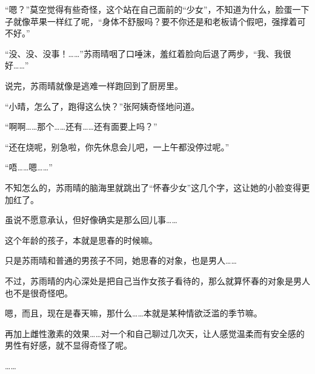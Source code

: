 “嗯？”莫空觉得有些奇怪，这个站在自己面前的“少女”，不知道为什么，脸蛋一下子就像苹果一样红了呢，“身体不舒服吗？要不你还是和老板请个假吧，强撑着可不好。”

“没、没、没事！……”苏雨晴咽了口唾沫，羞红着脸向后退了两步，“我、我很好……”

说完，苏雨晴就像是逃难一样跑回到了厨房里。

“小晴，怎么了，跑得这么快？”张阿姨奇怪地问道。

“啊啊……那个……还有……还有面要上吗？”

“还在烧呢，别急啦，你先休息会儿吧，一上午都没停过呢。”

“唔……嗯……”

不知怎么的，苏雨晴的脑海里就跳出了“怀春少女”这几个字，这让她的小脸变得更加红了。

虽说不愿意承认，但好像确实是那么回儿事……

这个年龄的孩子，本就是思春的时候嘛。

只是苏雨晴和普通的男孩子不同，她思春的对象，也是男人……

不过，苏雨晴的内心深处是把自己当作女孩子看待的，那么就算怀春的对象是男人也不是很奇怪吧。

嗯，而且，现在是春天嘛，那什么……本就是某种情欲泛滥的季节嘛。

再加上雌性激素的效果……对一个和自己聊过几次天，让人感觉温柔而有安全感的男性有好感，就不显得奇怪了呢。

……
